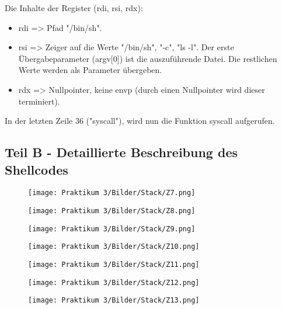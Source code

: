 \documentclass[12pt]{article}
\begin{document}
Die Inhalte der Register (rdi, rsi, rdx):
\begin{itemize}
\item rdi => Pfad "/bin/sh".
\item rsi => Zeiger auf die Werte "/bin/sh", "-c", "ls -l". \newline
Der erste Übergabeparameter (argv[0]) ist die auszuführende Datei. Die restlichen Werte werden als Parameter übergeben.
\item rdx => Nullpointer, keine envp (durch einen Nullpointer wird dieser terminiert).
\end{itemize}

In der letzten Zeile 36 ("syscall"), wird nun die Funktion syscall aufgerufen.
\newpage

\subsection{Teil B - Detaillierte Beschreibung des Shellcodes }

\begin{figure}[htbp]
    \centering
    \texttt{[image: Praktikum 3/Bilder/Stack/Z7.png]}
\end{figure}
\newpage

\begin{figure}[htbp]
    \centering
    \texttt{[image: Praktikum 3/Bilder/Stack/Z8.png]}
\end{figure}
\newpage

\begin{figure}[htbp]
    \centering
    \texttt{[image: Praktikum 3/Bilder/Stack/Z9.png]}
\end{figure}
\newpage

\begin{figure}[htbp]
    \centering
    \texttt{[image: Praktikum 3/Bilder/Stack/Z10.png]}
\end{figure}
\newpage

\begin{figure}[htbp]
    \centering
    \texttt{[image: Praktikum 3/Bilder/Stack/Z11.png]}
\end{figure}
\newpage

\begin{figure}[htbp]
    \centering
    \texttt{[image: Praktikum 3/Bilder/Stack/Z12.png]}
\end{figure}
\newpage

\begin{figure}[htbp]
    \centering
    \texttt{[image: Praktikum 3/Bilder/Stack/Z13.png]}
\end{figure}
\newpage
\end{document}
